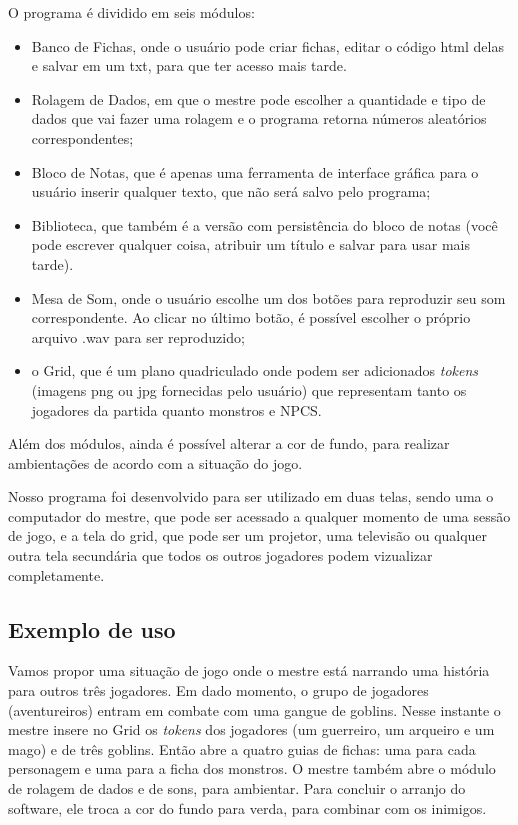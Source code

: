 \documentclass[
	article,			%
	11pt,				%
	oneside,			%
	a4paper,			%
	english,			%
	brazil,				%
	sumario=tradicional
	]{abntex2}
\begin{document}
O programa é dividido em seis módulos:
 \begin{itemize}
   \item Banco de Fichas, onde o usuário pode criar fichas, editar o código html delas e salvar em um txt, para que ter acesso mais tarde.
   
	\item Rolagem de Dados, em que o mestre pode escolher a quantidade e tipo de dados que vai fazer uma rolagem e o programa retorna números aleatórios correspondentes;
    
	\item Bloco de Notas, que é apenas uma ferramenta de interface gráfica para o usuário inserir qualquer texto, que não será salvo pelo programa;
    
    \item Biblioteca, que também é a versão com persistência do bloco de notas (você pode escrever qualquer coisa, atribuir um título e salvar para usar mais tarde).
    
    \item Mesa de Som, onde o usuário escolhe um dos botões para reproduzir seu som correspondente. Ao clicar no último botão, é possível escolher o próprio arquivo .wav para ser reproduzido;
 
    \item o Grid, que é um plano quadriculado onde podem ser adicionados \textit{tokens} (imagens png ou jpg fornecidas pelo usuário) que representam tanto os jogadores da partida quanto monstros e NPCS.
 \end{itemize}
 	
    Além dos módulos, ainda é possível alterar a cor de fundo, para realizar ambientações de acordo com a situação do jogo.
    
 	Nosso programa foi desenvolvido para ser utilizado em duas telas, sendo uma o computador do mestre, que pode ser acessado a qualquer momento de uma sessão de jogo, e a tela do grid, que pode ser um projetor, uma televisão ou qualquer outra tela secundária que todos os outros jogadores podem vizualizar completamente.
    
    \subsection{Exemplo de uso}
    
    Vamos propor uma situação de jogo onde o mestre está narrando uma história para outros três jogadores. Em dado momento, o grupo de jogadores (aventureiros) entram em combate com uma gangue de goblins. Nesse instante o mestre insere no Grid os \textit{tokens} dos jogadores (um guerreiro, um arqueiro e um mago) e de três goblins. Então abre a quatro guias de fichas: uma para cada personagem e uma para a ficha dos monstros. O mestre também abre o módulo de rolagem de dados e de sons, para ambientar. Para concluir o arranjo do software, ele troca a cor do fundo para verda, para combinar com os inimigos.
    
\end{document}
